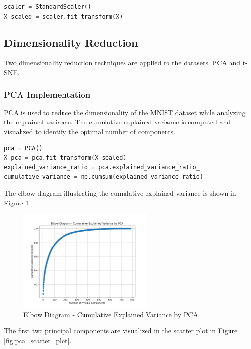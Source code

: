 \begin{lstlisting}[language=Python]
scaler = StandardScaler()
X_scaled = scaler.fit_transform(X)
\end{lstlisting}

\subsection{Dimensionality Reduction}
Two dimensionality reduction techniques are applied to the datasets: PCA and t-SNE.

\subsubsection{PCA Implementation}
PCA is used to reduce the dimensionality of the MNIST dataset while analyzing the explained variance. The cumulative explained variance is computed and visualized to identify the optimal number of components.

\begin{lstlisting}[language=Python]
pca = PCA()
X_pca = pca.fit_transform(X_scaled)
explained_variance_ratio = pca.explained_variance_ratio_
cumulative_variance = np.cumsum(explained_variance_ratio)
\end{lstlisting}

The elbow diagram illustrating the cumulative explained variance is shown in Figure \ref{fig:elbow_diagram}.

\begin{figure}[H]
    \centering
    \includegraphics[width=0.6\textwidth]{Images/P3-elbow_diagram.png}
    \caption{Elbow Diagram - Cumulative Explained Variance by PCA}
    \label{fig:elbow_diagram}
\end{figure}

The first two principal components are visualized in the scatter plot in Figure \ref{fig:pca_scatter_plot}.

